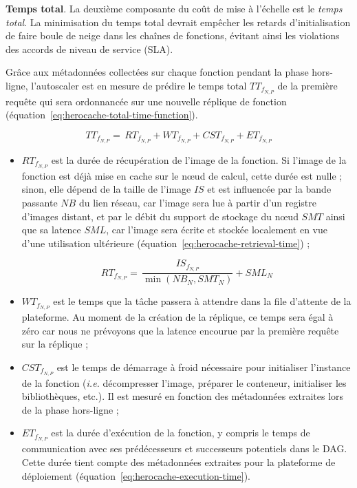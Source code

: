 \textbf{Temps total}. La deuxième composante du coût de mise à l'échelle est le \textit{temps total}. La minimisation du temps total devrait empêcher les retards d'initialisation de faire boule de neige dans les chaînes de fonctions, évitant ainsi les violations des accords de niveau de service (SLA).

Grâce aux métadonnées collectées sur chaque fonction pendant la phase hors-ligne, l'autoscaler est en mesure de prédire le temps total ${TT}_{{f}_{N, P}}$ de la première requête qui sera ordonnancée sur une nouvelle réplique de fonction (équation~\ref{eq:herocache-total-time-function}).

\begin{equation}
    {TT}_{{f}_{N, P}} = \, {RT}_{{f}_{N, P}} + {WT}_{{f}_{N, P}} + {CST}_{{f}_{N, P}} + {ET}_{{f}_{N, P}}
\label{eq:herocache-total-time-function}
\end{equation}

\begin{itemize}
    \item ${RT}_{{f}_{N, P}}$ est la durée de récupération de l'image de la fonction. Si l'image de la fonction est déjà mise en cache sur le nœud de calcul, cette durée est nulle ; sinon, elle dépend de la taille de l'image $IS$ et est influencée par la bande passante $NB$ du lien réseau, car l'image sera lue à partir d'un registre d'images distant, et par le débit du support de stockage du nœud $SMT$ ainsi que sa latence $SML$, car l'image sera écrite et stockée localement en vue d'une utilisation ultérieure (équation~\ref{eq:herocache-retrieval-time}) ;

    \begin{equation}
        {RT}_{{f}_{N, P}} = \, \frac{IS_{{f}_{N, P}}}{\min (NB_{N}, SMT_{N})} + SML_{N}
        \label{eq:herocache-retrieval-time}
    \end{equation}

    \item ${WT}_{{f}_{N, P}}$ est le temps que la tâche passera à attendre dans la file d'attente de la plateforme. Au moment de la création de la réplique, ce temps sera égal à zéro car nous ne prévoyons que la latence encourue par la première requête sur la réplique ;
    \item ${CST}_{{f}_{N, P}}$ est le temps de démarrage à froid nécessaire pour initialiser l'instance de la fonction (\textit{i.e.} décompresser l'image, préparer le conteneur, initialiser les bibliothèques, etc.). Il est mesuré en fonction des métadonnées extraites lors de la phase hors-ligne ;
    \item ${ET}_{{f}_{N, P}}$ est la durée d'exécution de la fonction, y compris le temps de communication avec ses prédécesseurs et successeurs potentiels dans le DAG. Cette durée tient compte des métadonnées extraites pour la plateforme de déploiement (équation~\ref{eq:herocache-execution-time}).
\end{itemize}

